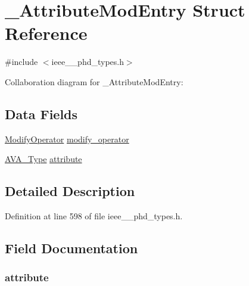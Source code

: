 \hypertarget{struct___attribute_mod_entry}{}\section{\+\_\+\+Attribute\+Mod\+Entry Struct Reference}
\label{struct___attribute_mod_entry}


{\ttfamily \#include $<$ieee\+\_\+\_\+phd\+\_\+types.\+h$>$}



Collaboration diagram for \+\_\+\+Attribute\+Mod\+Entry\+:
\subsection*{Data Fields}
\begin{DoxyCompactItemize}
\item 
\hyperlink{ieee__11073__phd__types_8h_a82eda784abcf124fc12f2e0336e34e9b}{Modify\+Operator} \hyperlink{struct___attribute_mod_entry_a949683c50730e24d4aa0216a294d31e9}{modify\+\_\+operator}
\item 
\hyperlink{ieee__11073__phd__types_8h_aafe814221abf9b10555527f0fdee0ef9}{A\+V\+A\+\_\+\+Type} \hyperlink{struct___attribute_mod_entry_a6404e42691147e8b12e6fbc6c32cc831}{attribute}
\end{DoxyCompactItemize}


\subsection{Detailed Description}


Definition at line 598 of file ieee\+\_\+\_\+phd\+\_\+types.\+h.



\subsection{Field Documentation}
\hypertarget{struct___attribute_mod_entry_a6404e42691147e8b12e6fbc6c32cc831}{}
\subsubsection[{attribute}]{ attribute}\label{struct___attribute_mod_entry_a6404e42691147e8b12e6fbc6c32cc831}


